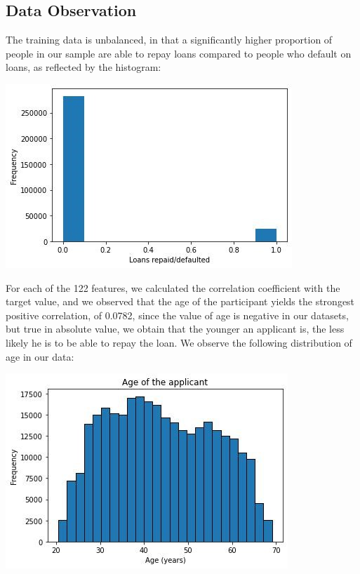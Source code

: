 \documentclass[sigconf, nonacm]{acmart}
\begin{document}
\subsection{Data Observation}
The training data is unbalanced, in that a significantly higher proportion of people in our sample are able to repay loans compared to people who default on loans, as reflected by the histogram: 

\includegraphics[width=\linewidth]{figures/fig.jpg}

For each of the 122 features, we calculated the correlation coefficient with the target value, and we observed that the age of the participant yields the strongest positive correlation, of 0.0782, since the value of age is negative in our datasets, but true in absolute value, we obtain that the younger an applicant is, the less likely he is to be able to repay the loan. We observe the following distribution of age in our data:  

\includegraphics[width=\linewidth]{figures/FIG2.jpg}
\end{document}
